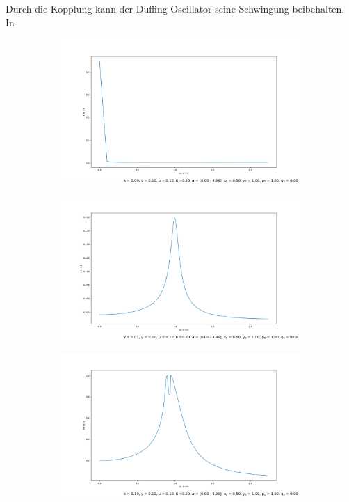 \documentclass[oneside,10pt,a4paper]{report}
\begin{document}
		Durch die Kopplung kann der Duffing-Oscillator seine Schwingung beibehalten. In 
	\begin{figure}[H]
		\centering
		\begin{subfigure}[b]{0.45\textwidth}
			\includegraphics[width=\textwidth]{resonanz1.png}
			\caption{}
			\label{fig:resonanz1}
		\end{subfigure}
		\hfill
		\begin{subfigure}[b]{0.45\textwidth}
			\includegraphics[width=\textwidth]{resonanz2.png}
			\caption{}
			\label{fig:resonanz2}
		\end{subfigure}
		\begin{subfigure}[b]{0.45\textwidth}
			\includegraphics[width=\textwidth]{resonanz3.png}

\end{subfigure}
\end{figure}
\end{document}

